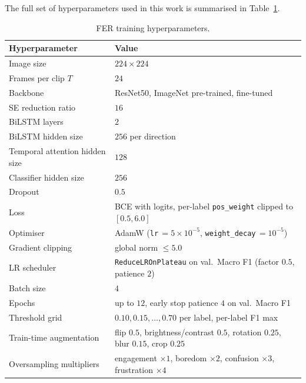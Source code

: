 The full set of hyperparameters used in this work is summarised in Table~\ref{tab:fer_hparams}.

\begin{table}[H]
\centering
\caption{FER training hyperparameters.}
\label{tab:fer_hparams}
\begin{tabular}{ll}
\toprule
\textbf{Hyperparameter} & \textbf{Value} \\
\midrule
Image size                      & $224 \times 224$ \\
Frames per clip $T$             & $24$ \\
Backbone                        & ResNet50, ImageNet pre-trained, fine-tuned \\
SE reduction ratio              & $16$ \\
BiLSTM layers                   & $2$ \\
BiLSTM hidden size              & $256$ per direction \\
Temporal attention hidden size  & $128$ \\
Classifier hidden size          & $256$ \\
Dropout                         & $0.5$ \\
Loss                            & BCE with logits, per-label \texttt{pos\_weight} clipped to $[0.5, 6.0]$ \\
Optimiser                       & AdamW (\texttt{lr}\,$=5\!\times\!10^{-5}$, \texttt{weight\_decay}\,$=10^{-5}$) \\
Gradient clipping               & global norm $\leq 5.0$ \\
LR scheduler                    & \texttt{ReduceLROnPlateau} on val.\ Macro F1 (factor $0.5$, patience $2$) \\
Batch size                      & $4$ \\
Epochs                          & up to $12$, early stop patience $4$ on val.\ Macro F1 \\
Threshold grid                  & $0.10, 0.15, \dots, 0.70$ per label, per-label F1 max \\
Train-time augmentation         & flip $0.5$, brightness/contrast $0.5$, rotation $0.25$, blur $0.15$, crop $0.25$ \\
Oversampling multipliers        & engagement $\times 1$, boredom $\times 2$, confusion $\times 3$, frustration $\times 4$ \\
\bottomrule
\end{tabular}
\end{table}

